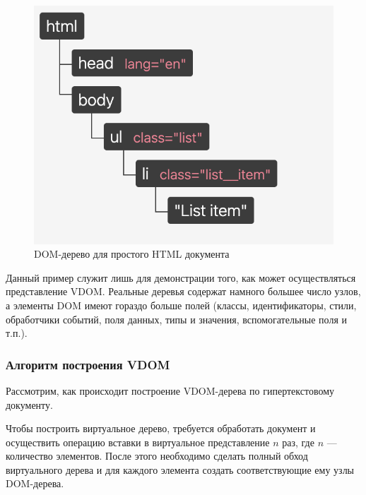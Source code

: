 \begin{figure}[h]
	\centering
	\includegraphics[width=140mm]{img/dom-to-vdom-dom.png}
	\caption{DOM-дерево для простого HTML документа}
	\label{fig:dom-to-vdom-dom}
\end{figure}


Данный пример служит лишь для демонстрации того, как может осуществляться представление VDOM. 
Реальные деревья содержат намного большее число узлов, а элементы DOM имеют гораздо больше полей (классы, идентификаторы, стили, обработчики событий, поля данных, типы и значения, вспомогательные поля и т.п.).

\subsubsection{Алгоритм построения VDOM}

Рассмотрим, как происходит построение VDOM-дерева по гипертекстовому документу.

Чтобы построить виртуальное дерево, требуется обработать документ и осуществить операцию вставки в виртуальное представление $n$ раз, где $n$ --- количество элементов. 
После этого необходимо сделать полный обход виртуального дерева и для каждого элемента создать соответствующие ему узлы DOM-дерева.




